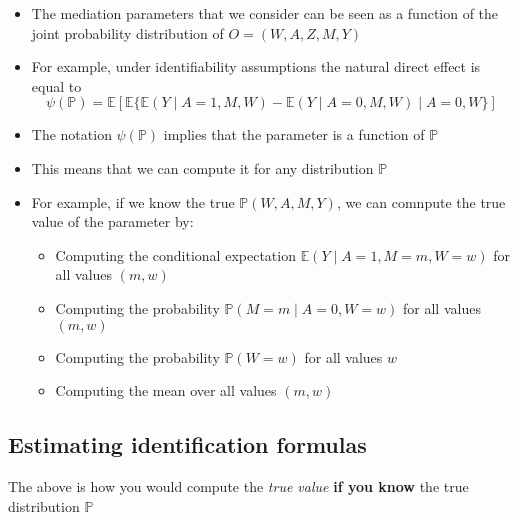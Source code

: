\documentclass[
  12pt,
]{book}
\providecommand{\tightlist}{%
  \setlength{\itemsep}{0pt}\setlength{\parskip}{0pt}}
\theoremstyle{definition}
\theoremstyle{definition}
\theoremstyle{definition}
\renewcommand{\P}{\mathbb{P}}
\newcommand{\E}{\mathbb{E}}
\newcommand{\1}{\mathbbm{1}}
\begin{document}
\begin{itemize}
\tightlist
\item
  The mediation parameters that we consider can be
  seen as a function of the joint probability distribution of \(O=(W,A,Z,M,Y)\)
\item
  For example, under identifiability assumptions the natural direct effect is
  equal to
  \begin{equation*}
    \psi(\P) =  \E[\E\{\E(Y \mid A=1, M, W) - \E(Y \mid A=0, M, W)\mid A=0,W\}]
  \end{equation*}
\item
  The notation \(\psi(\P)\) implies that the parameter is a function of \(\P\)
\item
  This means that we can compute it for any distribution \(\P\)
\item
  For example, if we know the true \(\P(W,A,M,Y)\), we can comnpute the true value
  of the parameter by:

  \begin{itemize}
  \tightlist
  \item
    Computing the conditional expectation \(\E(Y\mid A=1,M=m,W=w)\) for all
    values \((m,w)\)
  \item
    Computing the probability \(\P(M=m\mid A=0,W=w)\) for all values \((m,w)\)
  \item
    Computing the probability \(\P(W=w)\) for all values \(w\)
  \item
    Computing the mean over all values \((m,w)\)
  \end{itemize}
\end{itemize}

\hypertarget{estimating-identification-formulas}{%
\subsection{Estimating identification formulas}\label{estimating-identification-formulas}}

The above is how you would compute the \emph{true value} \textbf{if you know} the true
distribution \(\P\)
\end{document}
